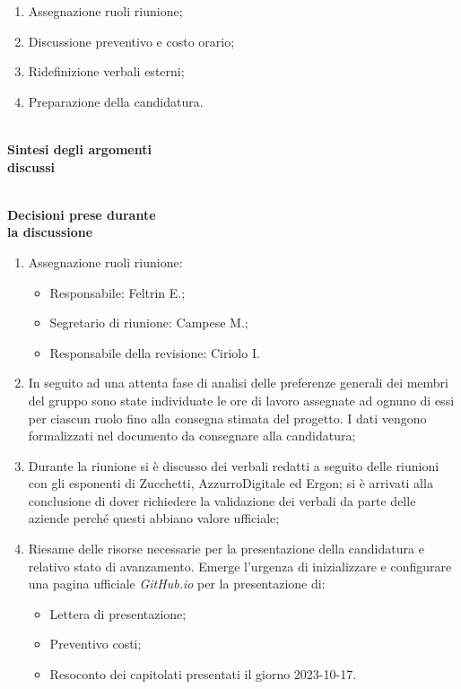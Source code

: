 \documentclass{article}
\begin{document}
\begin{paracol}{2}
\begin{enumerate}
    \item Assegnazione ruoli riunione;
    \item Discussione preventivo e costo orario; 
    \item Ridefinizione verbali esterni;
    \item Preparazione della candidatura.
\end{enumerate}

\newpage

\switchcolumn
\newpage

\\
\textbf{Sintesi degli argomenti\\discussi}

\vspace{13.6cm}

\\
\textbf{Decisioni prese durante\\la discussione}

\switchcolumn
\begin{enumerate}
     \item Assegnazione ruoli riunione:
    \begin{itemize}
        \item Responsabile: Feltrin E.;
        \item Segretario di riunione: Campese M.;
        \item Responsabile della revisione: Ciriolo I.
    \end{itemize}
    \item In seguito ad una attenta fase di analisi delle preferenze generali dei membri del gruppo sono state individuate le ore di lavoro assegnate ad ognuno di essi per ciascun ruolo fino alla consegna stimata del progetto. I dati vengono formalizzati nel documento da consegnare alla candidatura;
    \item Durante la riunione si è discusso dei verbali redatti a seguito delle riunioni con gli esponenti di Zucchetti, AzzurroDigitale ed Ergon; si è arrivati alla conclusione di dover richiedere la validazione dei verbali da parte delle aziende perché questi abbiano valore ufficiale;
    \item Riesame delle risorse necessarie per la presentazione della candidatura e relativo stato di avanzamento. Emerge l'urgenza di inizializzare e configurare una pagina ufficiale \textit{GitHub.io} per la presentazione di:
    \begin{itemize}
        \item Lettera di presentazione;
        \item Preventivo costi;
        \item Resoconto dei capitolati presentati il giorno 2023-10-17.
    \end{itemize}
\end{enumerate}


\end{paracol}
\end{document}
